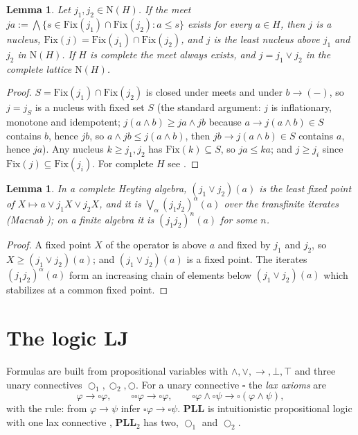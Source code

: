 \documentclass[11pt]{amsart}
\newtheorem{lem}[thm]{Lemma}
\theoremstyle{definition}
\newcommand{\Fix}{\mathrm{Fix}}
\newcommand{\Nuc}{\mathrm{N}}
\newcommand{\LLJ}{\mathbf{LJ}}
\newcommand{\PLL}{\mathbf{PLL}}
\newcommand{\PLLt}{\mathbf{PLL}_2}
\newcommand{\lax}{\bigcirc}
\newcommand{\laxa}{\bigcirc_1}
\newcommand{\laxb}{\bigcirc_2}
\begin{document}
\begin{lem}\label{lem:join}
Let $j_1,j_2\in\Nuc(H)$. If the meet
$ja:=\bigwedge\{s\in\Fix(j_1)\cap\Fix(j_2):a\le s\}$ exists for every $a\in H$,
then $j$ is a nucleus, $\Fix(j)=\Fix(j_1)\cap\Fix(j_2)$, and $j$ is the least
nucleus above $j_1$ and $j_2$ in $\Nuc(H)$. If $H$ is complete the meet always
exists, and $j=j_1\vee j_2$ in the complete lattice $\Nuc(H)$.
\end{lem}
\begin{proof}
$S=\Fix(j_1)\cap\Fix(j_2)$ is closed under meets and under $b\to(-)$, so $j=j_S$
is a nucleus with fixed set $S$ (the standard argument: $j$ is inflationary,
monotone and idempotent; $j(a\wedge b)\ge ja\wedge jb$ because
$a\to j(a\wedge b)\in S$ contains $b$, hence $jb$, so $a\wedge jb\le j(a\wedge b)$,
then $jb\to j(a\wedge b)\in S$ contains $a$, hence $ja$). Any nucleus $k\ge j_1,j_2$
has $\Fix(k)\subseteq S$, so $ja\le ka$; and $j\ge j_i$ since $\Fix(j)\subseteq\Fix(j_i)$.
For complete $H$ see \cite[II.2.3]{Johnstone}.
\end{proof}

\begin{lem}\label{lem:lfp}
In a complete Heyting algebra, $(j_1\vee j_2)(a)$ is the least fixed point of
$X\mapsto a\vee j_1X\vee j_2X$, and it is $\bigvee_\alpha(j_1j_2)^\alpha(a)$ over
the transfinite iterates (Macnab \cite{Macnab}); on a finite algebra it is
$(j_1j_2)^n(a)$ for some $n$.
\end{lem}
\begin{proof}
A fixed point $X$ of the operator is above $a$ and fixed by $j_1$ and $j_2$,
so $X\ge(j_1\vee j_2)(a)$; and $(j_1\vee j_2)(a)$ is a fixed point. The iterates
$(j_1j_2)^\alpha(a)$ form an increasing chain of elements below
$(j_1\vee j_2)(a)$ which stabilizes at a common fixed point.
\end{proof}

\section{The logic $\LLJ$}\label{sec:logic}

Formulas are built from propositional variables with $\wedge,\vee,\to,\bot,\top$
and three unary connectives $\laxa,\laxb,\lax$. For a unary connective $\square$
the \emph{lax axioms} are
\[
\varphi\to\square\varphi,\qquad\square\square\varphi\to\square\varphi,\qquad
\square\varphi\wedge\square\psi\to\square(\varphi\wedge\psi),
\]
with the rule: from $\varphi\to\psi$ infer $\square\varphi\to\square\psi$.
$\PLL$ is intuitionistic propositional logic with one lax connective
\cite{FM}, $\PLLt$ has two, $\laxa$ and $\laxb$.
\end{document}
